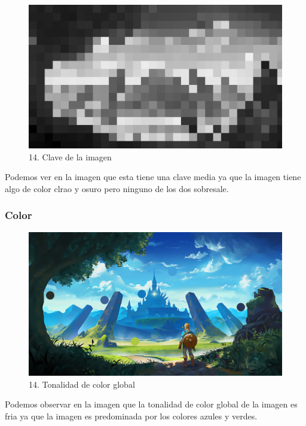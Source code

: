 \documentclass[12pt]{article}
\begin{document}
    \begin{figure}[H]
      \centering
      \includegraphics[scale=0.35]{images/Selena/14 pixelada.png}
      \caption{\small 14. Clave de la imagen}
    \end{figure}
    Podemos ver en la imagen que esta tiene una clave media ya que la imagen tiene algo de color clrao y osuro pero ninguno de los dos sobresale.

    \subsubsection{Color}
    \begin{figure}[H]
      \centering
      \includegraphics[scale=0.35]{images/Selena/14_concept_art color.jpg}
      \caption{\small 14. Tonalidad de color global}
    \end{figure}
    Podemos observar en la imagen que la tonalidad de color global de la imagen es fria ya que la imagen es predominada por los colores azules y verdes.
\end{document}

